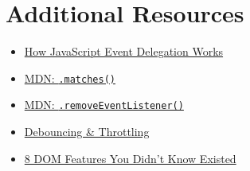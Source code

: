 \section{Additional Resources}

\begin{itemize}[leftmargin=*]
    \item \href{https://davidwalsh.name/event-delegate}{How JavaScript Event Delegation Works}
    \item \href{https://developer.mozilla.org/en-US/docs/Web/API/Element/matches}{MDN: \texttt{.matches()}}
    \item \href{https://developer.mozilla.org/en-US/docs/Web/API/EventTarget/removeEventListener}{MDN: \texttt{.removeEventListener()}}
    \item \href{https://css-tricks.com/debouncing-throttling-explained-examples/}{Debouncing \& Throttling}
    \item \href{https://blog.logrocket.com/8-dom-features-you-didnt-know-existed-ec2a0a28fd89/}{8 DOM Features You Didn't Know Existed}
\end{itemize}

